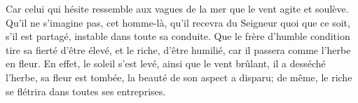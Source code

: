 Car celui qui hésite ressemble aux vagues de la mer que le vent agite et soulève.
Qu’il ne s’imagine pas, cet homme-là, qu’il recevra du Seigneur quoi que ce soit,
	s’il est partagé, instable dans toute sa conduite.
Que le frère d’humble condition tire sa fierté d’être élevé,
	et le riche, d’être humilié, car il passera comme l’herbe en fleur.
En effet, le soleil s’est levé, ainsi que le vent brûlant,
	il a desséché l’herbe, sa fleur est tombée, la beauté de son aspect a disparu;
	de même, le riche se flétrira dans toutes ses entreprises.
